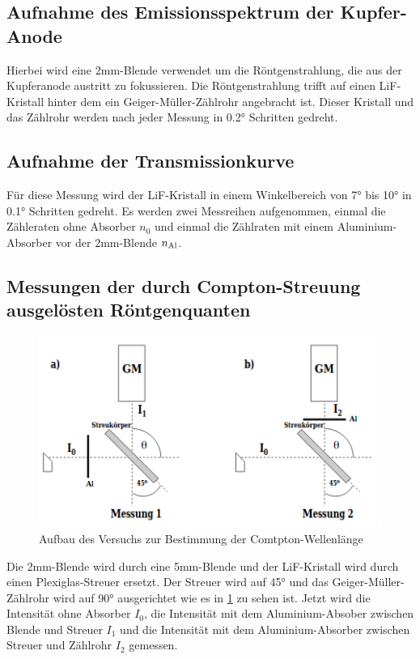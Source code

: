 \documentclass[titlepage = firstcover]{scrartcl}
\begin{document}
        \subsection{Aufnahme des Emissionsspektrum der Kupfer-Anode}
          Hierbei wird eine 2mm-Blende verwendet um die Röntgenstrahlung, die aus der Kupferanode austritt zu fokussieren. Die Röntgenstrahlung trifft auf einen LiF-Kristall hinter dem ein Geiger-Müller-Zählrohr angebracht ist. Dieser Kristall und das Zählrohr werden nach jeder Messung in 0.2° Schritten gedreht.

        \subsection{Aufnahme der Transmissionkurve}
          Für diese Messung wird der LiF-Kristall in einem Winkelbereich von 7° bis 10° in 0.1° Schritten gedreht. Es werden zwei Messreihen aufgenommen, einmal die Zähleraten ohne Absorber $n_0$ und einmal die Zählraten mit einem Aluminium-Absorber vor der 2mm-Blende $n_\textup{Al}$.

        \subsection{Messungen der durch Compton-Streuung ausgelösten Röntgenquanten} \label{messungen}
          \begin{figure}[h]
            \centering
            \includegraphics[width = 0.6\linewidth]{Compton_Aufbau.png}
            \caption{Aufbau des Versuchs zur Bestimmung der Comtpton-Wellenlänge}
            \label{fig:aufbau}
          \end{figure}
          \FloatBarrier
          
          Die 2mm-Blende wird durch eine 5mm-Blende und der LiF-Kristall wird durch einen Plexiglas-Streuer ersetzt. Der Streuer wird auf 45° und das Geiger-Müller-Zählrohr wird auf 90° ausgerichtet wie es in \ref{fig:aufbau} zu sehen ist. Jetzt wird die Intensität ohne Absorber $I_0$, die Intensität mit dem Aluminium-Absober zwischen Blende und Streuer $I_1$ und die Intensität mit dem Aluminium-Absorber zwischen Streuer und Zählrohr $I_2$ gemessen.
      
\end{document}
